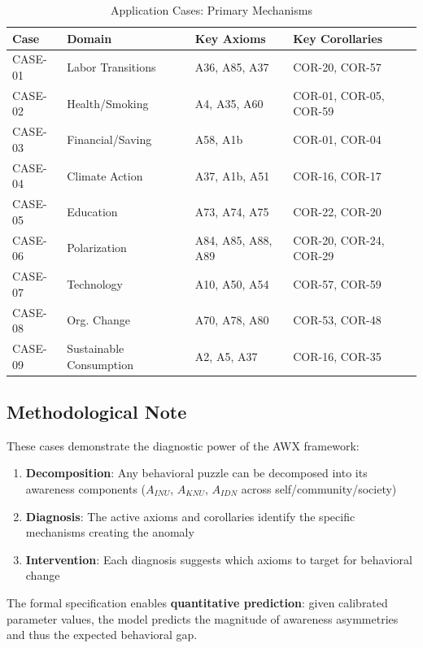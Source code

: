 \begin{table}[htbp]
\centering
\caption{Application Cases: Primary Mechanisms}
\label{tab:case-summary}
\small
\begin{tabular}{llll}
\toprule
\textbf{Case} & \textbf{Domain} & \textbf{Key Axioms} & \textbf{Key Corollaries} \\
\midrule
CASE-01 & Labor Transitions & A36, A85, A37 & COR-20, COR-57 \\
CASE-02 & Health/Smoking & A4, A35, A60 & COR-01, COR-05, COR-59 \\
CASE-03 & Financial/Saving & A58, A1b & COR-01, COR-04 \\
CASE-04 & Climate Action & A37, A1b, A51 & COR-16, COR-17 \\
CASE-05 & Education & A73, A74, A75 & COR-22, COR-20 \\
CASE-06 & Polarization & A84, A85, A88, A89 & COR-20, COR-24, COR-29 \\
CASE-07 & Technology & A10, A50, A54 & COR-57, COR-59 \\
CASE-08 & Org. Change & A70, A78, A80 & COR-53, COR-48 \\
CASE-09 & Sustainable Consumption & A2, A5, A37 & COR-16, COR-35 \\
\bottomrule
\end{tabular}
\end{table}

\subsection{Methodological Note}

These cases demonstrate the diagnostic power of the AWX framework:

\begin{enumerate}
    \item \textbf{Decomposition}: Any behavioral puzzle can be decomposed into its awareness components ($A_{INU}$, $A_{KNU}$, $A_{IDN}$ across self/community/society)
    \item \textbf{Diagnosis}: The active axioms and corollaries identify the specific mechanisms creating the anomaly
    \item \textbf{Intervention}: Each diagnosis suggests which axioms to target for behavioral change
\end{enumerate}

The formal specification enables \textbf{quantitative prediction}: given calibrated parameter values, the model predicts the magnitude of awareness asymmetries and thus the expected behavioral gap.



